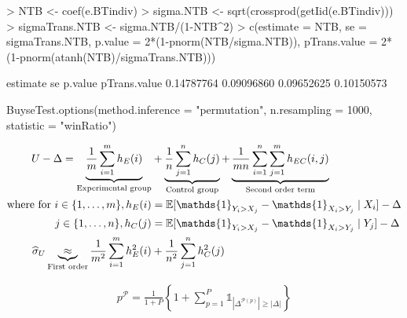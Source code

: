 \documentclass[12pt]{article}
\theoremstyle{definition}
\begin{document}
\begin{Rcode}
> NTB <- coef(e.BTindiv)
> sigma.NTB <- sqrt(crossprod(getIid(e.BTindiv)))
> sigmaTrans.NTB <- sigma.NTB/(1-NTB^2)
> c(estimate = NTB, se = sigmaTrans.NTB, p.value = 2*(1-pnorm(NTB/sigma.NTB)),
    pTrans.value = 2*(1-pnorm(atanh(NTB)/sigmaTrans.NTB)))
\end{Rcode}

\begin{Routput}
  estimate           se      p.value pTrans.value 
0.14787764   0.09096860   0.09652625   0.10150573 
\end{Routput}


\begin{Rcode}
BuyseTest.options(method.inference = "permutation", n.resampling = 1000,
                  statistic = "winRatio")
\end{Rcode}

\clearpage

\begin{align*}
	U - \Delta = \underbrace{\frac{1}{m} \sum_{i=1}^{m} h_E(i)}_{\text{Experimental group}}&  + \underbrace{\frac{1}{n} \sum_{j=1}^{n} h_C(j)}_{\text{Control group}} + \underbrace{ \frac{1}{m n}  \sum_{i=1}^{n}\sum_{j=1}^{m} h_{EC}(i,j)}_{\text{Second order term}} \notag \\
	\text{where for } i \in \{1,\ldots,m\}, h_E(i)&=\mathbb{E}[\mathds{1}_{Y_i > X_j} - \mathds{1}_{X_i > Y_j}\mid X_i] - \Delta \notag \\
	j \in \{1,\ldots,n\}, h_C(j)&=\mathbb{E}[\mathds{1}_{Y_i > X_j} - \mathds{1}_{X_i > Y_j}\mid Y_j] - \Delta \notag  \\
 \widehat{\sigma}_{U} \underbrace{\approx}_{\text{First order}} \frac{1}{m^2} \sum_{i=1}^m h^2_E(i) &+ \frac{1}{n^2} \sum_{j=1}^n h^2_C(j)
\end{align*}

\begin{align*}
	p^{\mathcal{P}} = \frac{1}{1+P} \left\{1+\sum_{p=1}^P \mathds{1}_{\left| \Delta^{\mathcal{P}(p)}\right| \geq \left|\Delta \right|} \right\}
\end{align*}
\end{document}
